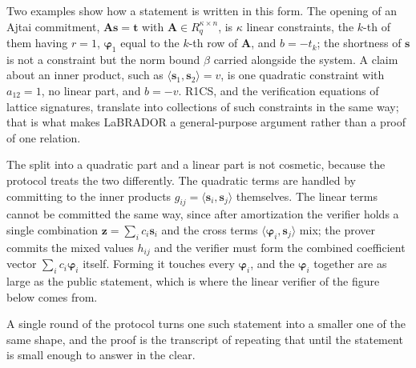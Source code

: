 Two examples show how a statement is written in this form. The opening of an
Ajtai commitment, $\mathbf{A}\mathbf{s}=\mathbf{t}$ with
$\mathbf{A}\in R_q^{\kappa\times n}$, is $\kappa$ linear constraints, the $k$-th
of them having $r=1$, $\boldsymbol{\varphi}_1$ equal to the $k$-th row of
$\mathbf{A}$, and $b=-t_k$; the shortness of $\mathbf{s}$ is not a constraint
but the norm bound $\beta$ carried alongside the system. A claim about an inner
product, such as $\langle\mathbf{s}_1,\mathbf{s}_2\rangle=v$, is one quadratic
constraint with $a_{12}=1$, no linear part, and $b=-v$. R1CS, and the
verification equations of lattice signatures, translate into collections of
such constraints in the same way; that is what makes LaBRADOR a
general-purpose argument rather than a proof of one relation.

The split into a quadratic part and a linear part is not cosmetic, because the
protocol treats the two differently. The quadratic terms are handled by
committing to the inner products $g_{ij}=\langle\mathbf{s}_i,\mathbf{s}_j\rangle$
themselves. The linear terms cannot be committed the same way, since after
amortization the verifier holds a single combination
$\mathbf{z}=\sum_ic_i\mathbf{s}_i$ and the cross terms
$\langle\boldsymbol{\varphi}_i,\mathbf{s}_j\rangle$ mix; the prover commits
the mixed values $h_{ij}$ and the verifier must form the combined coefficient
vector $\sum_ic_i\boldsymbol{\varphi}_i$ itself. Forming it touches every
$\boldsymbol{\varphi}_i$, and the $\boldsymbol{\varphi}_i$ together are as
large as the public statement, which is where the linear verifier of the
figure below comes from.

A single round of the protocol turns one such statement into a smaller one of
the same shape, and the proof is the transcript of repeating that until the
statement is small enough to answer in the clear.

